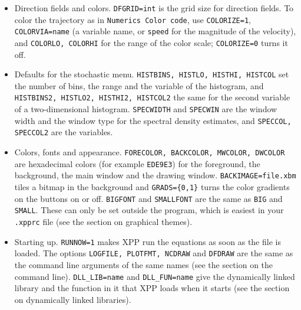 \documentclass{article}
\begin{document}
\begin{itemize}
{\tt n} are given by {\tt XLOn, XHIn, YLOn, YHIn}.  Normally the extra plots are added to the main window as curves of
different colors.  The flag {\tt MULTIWIN} instead creates a separate two-dimensional window for each of them.  The flag {\tt SIMPLOT} makes XPP plot the
solution in all the windows while the integration is running (the same as the {\tt SimPlot} item of the {\tt Makewindow} menu).
\item Direction fields and colors. {\tt DFGRID=int} is the grid size for direction fields.  To color the trajectory as in
{\tt Numerics Color code}, use {\tt COLORIZE=1}, {\tt COLORVIA=name} (a variable name, or {\tt speed} for the magnitude of the velocity),
and {\tt COLORLO, COLORHI} for the range of the color scale; {\tt COLORIZE=0} turns it off.
\item Defaults for the stochastic menu.  {\tt HISTBINS, HISTLO, HISTHI, HISTCOL} set the number of bins, the range and the variable of
the histogram, and {\tt HISTBINS2, HISTLO2, HISTHI2, HISTCOL2} the same for the second variable of a two-dimensional histogram.
{\tt SPECWIDTH} and {\tt SPECWIN} are the window width and the window type for the spectral density estimates, and {\tt SPECCOL, SPECCOL2}
are the variables.
\item Colors, fonts and appearance. {\tt FORECOLOR, BACKCOLOR, MWCOLOR, DWCOLOR} are hexadecimal colors (for example {\tt EDE9E3})
for the foreground, the background, the main window and the drawing window.  {\tt BACKIMAGE=file.xbm} tiles a bitmap in the background and
{\tt GRADS=\{0,1\}} turns the color gradients on the buttons on or off.  {\tt BIGFONT} and {\tt SMALLFONT} are the same as {\tt BIG} and {\tt SMALL}.
These can only be set outside the program, which is easiest in your {\tt .xpprc} file (see the section on graphical themes).
\item Starting up. {\tt RUNNOW=1} makes XPP run the equations as soon as the file is loaded.  The options
{\tt LOGFILE, PLOTFMT, NCDRAW} and {\tt DFDRAW} are the same as the command line arguments of the same names (see the section on the command line).
{\tt DLL\_LIB=name} and {\tt DLL\_FUN=name} give the dynamically linked library and the function in it that XPP loads when it
starts (see the section on dynamically linked libraries).
\end{itemize}
\end{document}
